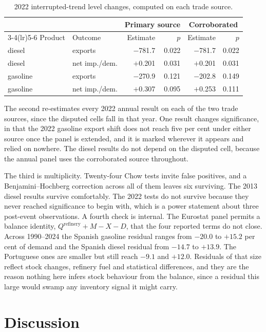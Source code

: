 \documentclass[11pt,a4paper]{article}
\begin{document}
\begin{table}[htbp]
\centering
\caption{2022 interrupted-trend level changes, computed on each trade source.}
\label{tab:sourcesens}
\begin{tabular}{llrrrr}
\toprule
& & \multicolumn{2}{c}{Primary source} & \multicolumn{2}{c}{Corroborated} \\
\cmidrule(lr){3-4}\cmidrule(lr){5-6}
Product & Outcome & Estimate & $p$ & Estimate & $p$ \\
\midrule
diesel & exports & $-$781.7 & 0.022 & $-$781.7 & 0.022 \\
diesel & net imp./dem. & $+$0.201 & 0.031 & $+$0.201 & 0.031 \\
gasoline & exports & $-$270.9 & 0.121 & $-$202.8 & 0.149 \\
gasoline & net imp./dem. & $+$0.307 & 0.095 & $+$0.253 & 0.111 \\
\bottomrule
\end{tabular}
\end{table}

The second re-estimates every 2022 annual result on each of the two trade sources, since the
disputed cells fall in that year. One result changes significance, in that the 2022 gasoline
export shift does not reach five per cent under either source once the panel is extended, and it is
marked wherever it appears and relied on nowhere. The diesel results do not depend on the
disputed cell, because the annual panel uses the corroborated source throughout.

The third is multiplicity. Twenty-four Chow tests invite false positives, and a Benjamini--Hochberg
correction across all of them leaves six surviving. The 2013 diesel results survive
comfortably. The 2022 tests do not survive because they never reached significance to begin
with, which is a power statement about three post-event observations. A fourth check is
internal. The Eurostat panel permits a balance identity, $Q^{\text{refinery}} + M - X - D$, that
the four reported terms do not close. Across 1990--2024 the Spanish gasoline residual ranges
from $-20.0$ to $+15.2$ per cent of demand and the Spanish diesel residual from $-14.7$ to
$+13.9$. The Portuguese ones are smaller but still reach $-9.1$ and $+12.0$. Residuals of that
size reflect stock changes, refinery fuel and statistical differences, and they are the reason
nothing here infers stock behaviour from the balance, since a residual this large would swamp
any inventory signal it might carry.

\section{Discussion}
\label{sec:discussion}
\end{document}
